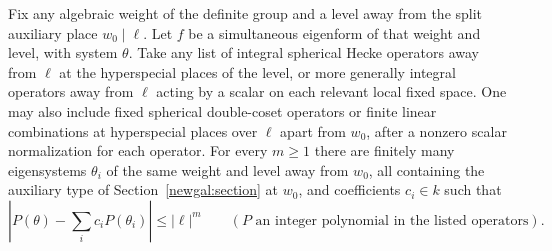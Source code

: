 \begin{proposition}\label{addg:auxiliary}
Fix any algebraic weight of the definite group and a level away from
the split auxiliary place \(w_0\mid\ell\). Let \(f\) be a simultaneous
eigenform of that weight and level, with system \(\theta\).
Take any list of integral spherical Hecke operators away from
\(\ell\) at the hyperspecial places of the level, or more generally
integral operators away from \(\ell\) acting by a scalar on each
relevant local fixed space. One may also include
fixed spherical double-coset operators or finite linear combinations
at hyperspecial places over \(\ell\) apart from \(w_0\), after a nonzero scalar
normalization for each operator. For every \(m\ge1\) there are finitely
many eigensystems \(\theta_i\) of the same weight and level away from
\(w_0\), all containing the auxiliary type of Section~\ref{newgal:section}
at \(w_0\), and coefficients \(c_i\in k\) such that
\[
   \left|P(\theta)-\sum_i c_iP(\theta_i)\right|
              \le |\ell|^m
      \qquad(P\text{ an integer polynomial in the listed operators}).
\]
\end{proposition}
